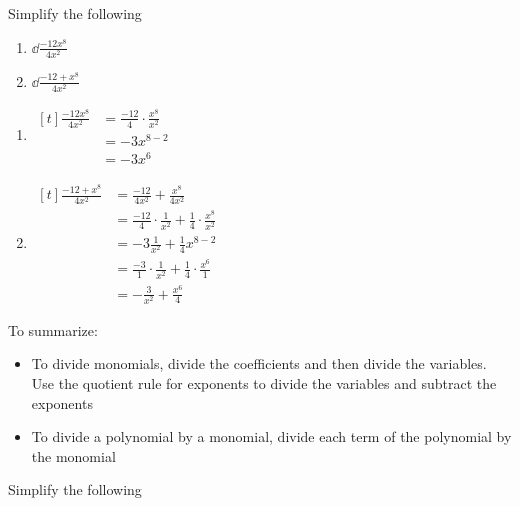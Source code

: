 \begin{myexample}
Simplify the following
\begin{multicols}{2}
	\begin{enumerate}
		\item $\dd\frac{-12x^8}{4x^2}$
		\item $\dd\frac{-12+x^8}{4x^2}$
	\end{enumerate} 
\end{multicols}
\end{myexample}
\begin{myProof}
	\begin{enumerate}
		\item  
		$\begin{aligned}[t]
			\frac{-12x^8}{4x^2} & =		\frac{-12}{4}\cdot\frac{x^8}{x^2} \\
			                    & =		-3x^{8-2}                         \\
			                    & =		-3x^6                             
		\end{aligned}$
		\item 
		$\begin{aligned}[t]
			\frac{-12+x^8}{4x^2} & =		\frac{-12}{4x^2}+\frac{x^8}{4x^2}                               \\
			                     & =		\frac{-12}{4}\cdot\frac{1}{x^2}+\frac{1}{4}\cdot\frac{x^8}{x^2} \\
			                     & =		-3 \frac{1}{x^2} + \frac{1}{4}x^{8-2}                           \\
			                     & =		\frac{-3}{1}\cdot\frac{1}{x^2}+\frac{1}{4}\cdot\frac{x^6}{1}    \\
			                     & =		-\frac{3}{x^2}+\frac{x^6}{4}                                    
		\end{aligned}$
	\end{enumerate} 
\end{myProof} 

To summarize: 
\begin{itemize}
	\item To divide monomials, divide the coefficients and then divide the variables. Use the quotient
	rule for exponents to divide the variables and subtract the exponents
	\item To divide a polynomial by a \gls{monomial}, divide each term of the polynomial by the monomial
\end{itemize} 

\begin{myexample}
Simplify the following
\drillandskill
\end{myexample}

